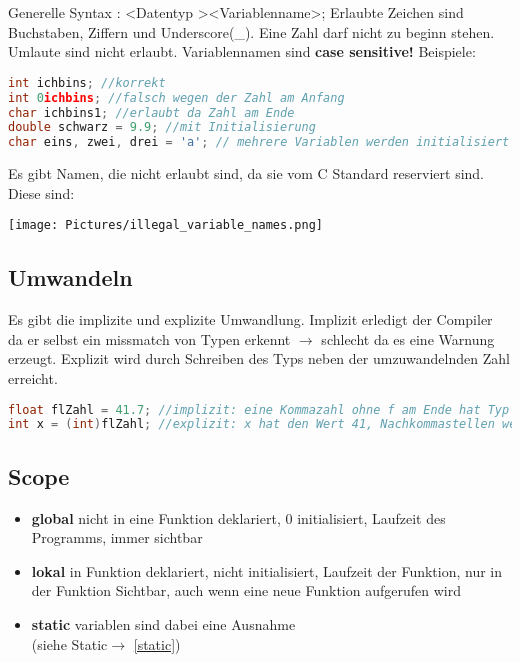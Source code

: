 Generelle Syntax : \textless Datentyp \textgreater \textless Variablenname\textgreater;\newline
Erlaubte Zeichen sind Buchstaben, Ziffern und Underscore(\_). Eine Zahl darf nicht zu beginn stehen. Umlaute sind nicht erlaubt. Variablennamen sind \textbf{case sensitive!}\newline
Beispiele:

\begin{lstlisting}[language = c]
int ichbins; //korrekt
int 0ichbins; //falsch wegen der Zahl am Anfang
char ichbins1; //erlaubt da Zahl am Ende
double schwarz = 9.9; //mit Initialisierung
char eins, zwei, drei = 'a'; // mehrere Variablen werden initialisiert aber nur "drei" wird mit 'a' initialisiert 
\end{lstlisting}

Es gibt Namen, die nicht erlaubt sind, da sie vom C Standard reserviert sind. Diese sind:\newline

\begin{center}
    \texttt{[image: Pictures/illegal\_variable\_names.png]}    
\end{center}

\subsection{Umwandeln}

Es gibt die implizite und explizite Umwandlung. Implizit erledigt der Compiler da er selbst ein missmatch von Typen erkennt $\rightarrow$ schlecht da es eine Warnung erzeugt.\newline
Explizit wird durch Schreiben des Typs neben der umzuwandelnden Zahl erreicht.

\begin{lstlisting}[language = c]
float flZahl = 41.7; //implizit: eine Kommazahl ohne f am Ende hat Typ double
int x = (int)flZahl; //explizit: x hat den Wert 41, Nachkommastellen werden abgeschnitten!
\end{lstlisting}

\subsection{Scope}

\begin{itemize}[itemsep=1pt, parsep=0pt]
    \item \textbf{global} \newline nicht in eine Funktion deklariert, 0 initialisiert, Laufzeit des Programms, immer sichtbar
    \item \textbf{lokal} \newline in Funktion deklariert, nicht initialisiert, Laufzeit der Funktion, nur in der Funktion Sichtbar, auch wenn eine neue Funktion aufgerufen wird
    \item \textbf{static} variablen sind dabei eine Ausnahme\\
    (siehe Static$\rightarrow$ \ref{static})
\end{itemize}

